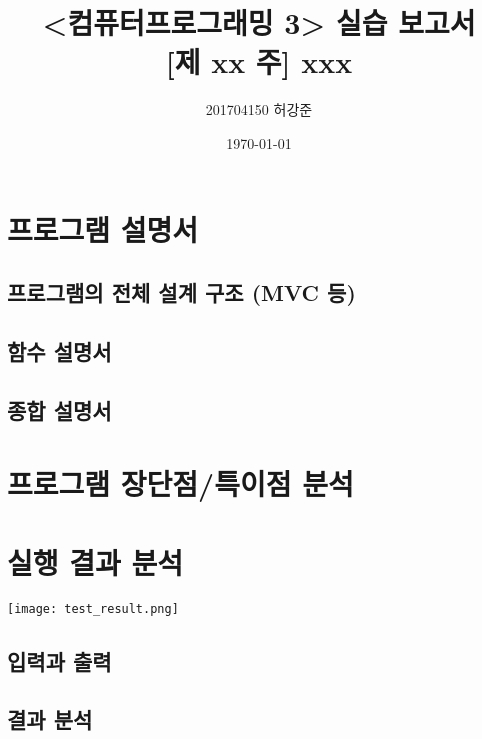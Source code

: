 \documentclass[UTF8]{report}
\title{%
    <컴퓨터프로그래밍 3> 실습 보고서 \\ 
    \large [제 xx 주] xxx}
\author{201704150 허강준}
\date{\today}
\begin{document}
    \maketitle
    \tableofcontents

    \chapter{프로그램 설명서}
        \section{프로그램의 전체 설계 구조 (MVC 등)}
        \section{함수 설명서}
        \section{종합 설명서}
    \chapter{프로그램 장단점/특이점 분석}
    \chapter{실행 결과 분석}
        \texttt{[image: test\_result.png]}
        \section{입력과 출력}
        \section{결과 분석}
\end{document}
